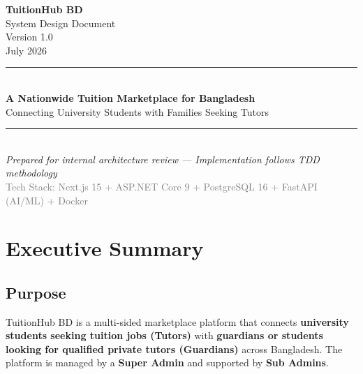 \documentclass[12pt,a4paper,twoside]{report}
\begin{document}
\begin{titlepage}
\centering
\vspace*{3cm}

\color{primary}
{\Huge\bfseries TuitionHub BD}\\[0.5cm]
{\LARGE\color{secondary} System Design Document}\\[2cm]

\color{dark}
{\large Version 1.0}\\[0.3cm]
{\large July 2026}\\[2cm]

\rule{0.6\textwidth}{0.5mm}\\[1cm]

{\large\textbf{A Nationwide Tuition Marketplace for Bangladesh}}\\[0.5cm]
{\large Connecting University Students with Families Seeking Tutors}\\[2cm]

\rule{0.6\textwidth}{0.5mm}\\[1cm]

{\small\textit{Prepared for internal architecture review --- Implementation follows TDD methodology}}\\[0.5cm]
{\small\textcolor{gray}{Tech Stack: Next.js 15 + ASP.NET Core 9 + PostgreSQL 16 + FastAPI (AI/ML) + Docker}}

\vfill
\end{titlepage}

\tableofcontents
\clearpage

\chapter{Executive Summary}

\section{Purpose}
TuitionHub BD is a multi-sided marketplace platform that connects \textbf{university students seeking tuition jobs (Tutors)} with \textbf{guardians or students looking for qualified private tutors (Guardians)} across Bangladesh. The platform is managed by a \textbf{Super Admin} and supported by \textbf{Sub Admins}.
\end{document}
